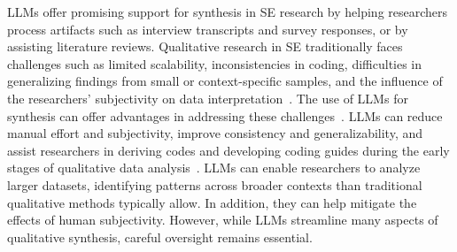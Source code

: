 LLMs offer promising support for synthesis in SE research by helping researchers process artifacts such as interview transcripts and survey responses, or by assisting literature reviews.
Qualitative research in SE traditionally faces challenges such as limited scalability, inconsistencies in coding, difficulties in generalizing findings from small or context-specific samples, and the influence of the researchers' subjectivity on data interpretation~\cite{DBLP:journals/ase/BanoHZT24}. 
The use of LLMs for synthesis can offer advantages in addressing these challenges~\cite{DBLP:journals/ase/BanoHZT24, barros2024largelanguagemodelqualitative, leça2024applicationsimplicationslargelanguage}.
LLMs can reduce manual effort and subjectivity, improve consistency and generalizability, and assist researchers in deriving codes and developing coding guides during the early stages of qualitative data analysis~\cite{DBLP:conf/chi/ByunVS23,DBLP:journals/ase/BanoHZT24}.
LLMs can enable researchers to analyze larger datasets, identifying patterns across broader contexts than traditional qualitative methods typically allow. In addition, they can help mitigate the effects of human subjectivity.
However, while LLMs streamline many aspects of qualitative synthesis, careful oversight remains essential.


